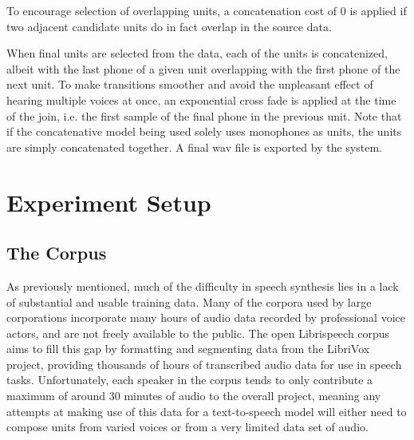 \documentclass[10pt, journal, compsoc]{IEEEtran}
\begin{document}
To encourage selection of overlapping units, a concatenation cost of 0 is applied if two adjacent candidate units do in fact overlap in the source data.\par
When final units are selected from the data, each of the units is concatenized, albeit with the last phone of a given unit overlapping with the first phone of the next unit. To make transitions smoother and avoid the unpleasant effect of hearing multiple voices at once, an exponential cross fade is applied at the time of the join, i.e. the first sample of the final phone in the previous unit. Note that if the concatenative model being used solely uses monophones as units, the units are simply concatenated together. A final wav file is exported by the system.
\section{Experiment Setup}
\subsection{The Corpus}
As previously mentioned, much of the difficulty in speech synthesis lies in a lack of substantial and usable training data. Many of the corpora used by large corporations incorporate many hours of audio data recorded by professional voice actors, and are not freely available to the public. The open Librispeech corpus\cite{unknown} aims to fill this gap by formatting and segmenting data from the LibriVox project, providing thousands of hours of transcribed audio data for use in speech tasks. Unfortunately, each speaker in the corpus tends to only contribute a maximum of around 30 minutes of audio to the overall project, meaning any attempts at making use of this data for a text-to-speech model will either need to compose units from varied voices or from a very limited data set of audio.\par
\end{document}
